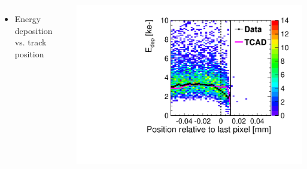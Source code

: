 \begin{frame}
\begin{columns}[t]
    \begin{itemize}
    \item Energy deposition vs. track position
    \end{itemize}
    \centering
    \includegraphics[width=\textwidth]{../figures/ActiveEdge/23_FGR_Edep_TCAD_data.pdf}

  \end{columns}

\end{frame}


